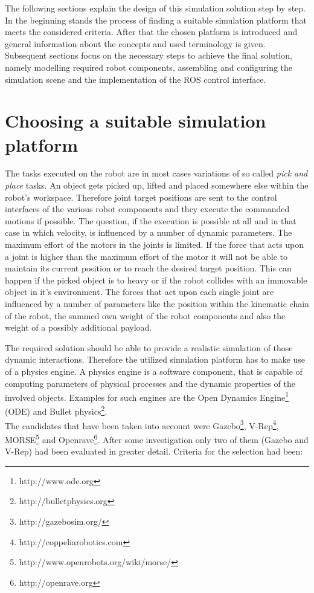 The following sections explain the design of this simulation solution step by step. In the beginning stands the process of finding a suitable simulation platform that meets the considered criteria. After that the chosen platform is introduced and general information about the concepts and used terminology is given. Subsequent sections focus on the necessary steps to achieve the final solution, namely modelling required robot components, assembling and configuring the simulation scene and the implementation of the ROS control interface.

\section{Choosing a suitable simulation platform}

The tasks executed on the robot are in most cases variations of so called \emph{pick and place} tasks. An object gets picked up, lifted and placed somewhere else within the robot's workspace. Therefore joint target positions are sent to the control interfaces of the various robot components and they execute the commanded motions if possible. The question, if the execution is possible at all and in that case in which velocity, is influenced by a number of dynamic parameters. The maximum effort of the motors in the joints is limited. If the force that acts upon a joint is higher than the maximum effort of the motor it will not be able to maintain its current position or to reach the desired target position. This can happen if the picked object is to heavy or if the robot collides with an immovable object in it's environment. The forces that act upon each single joint are influenced by a number of parameters like the position within the kinematic chain of the robot, the summed own weight of the robot components and also the weight of a possibly additional payload.

The required solution should be able to provide a realistic simulation of those dynamic interactions. Therefore the utilized simulation platform has to make use of a physics engine. A physics engine is a software component, that is capable of computing parameters of physical processes and the dynamic properties of the involved objects. Examples for such engines are the Open Dynamics Engine\footnote{http://www.ode.org} (ODE) and Bullet physics\footnote{http://bulletphysics.org}. \\

The candidates that have been taken into account were Gazebo\footnote{http://gazebosim.org/}, V-Rep\footnote{http://coppeliarobotics.com}, MORSE\footnote{http://www.openrobots.org/wiki/morse/} and Openrave\footnote{http://openrave.org}. After some investigation only two of them (Gazebo and V-Rep) had been evaluated in greater detail. Criteria for the selection had been:

